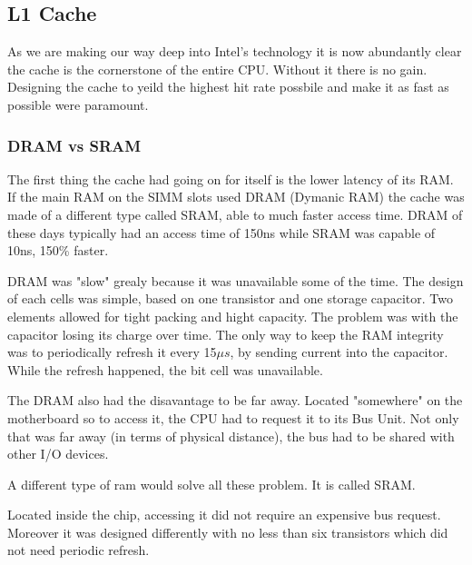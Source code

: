 \subsection{L1 Cache}
As we are making our way deep into Intel's technology it is now abundantly clear the cache is the cornerstone of the entire CPU. Without it there is no gain. Designing the cache to yeild the highest hit rate possbile and make it as fast as possible were paramount. 

\subsubsection{DRAM vs SRAM}
The first thing the cache had going on for itself is the lower latency of its RAM. If the main RAM on the SIMM slots used DRAM (Dymanic RAM) the cache was made of a different type called SRAM, able to  much faster access time. DRAM of these days typically had an access time of 150ns while SRAM was capable of 10ns, 150\% faster.\\
\par
DRAM was "slow" grealy because it was unavailable some of the time. The design of each cells was simple, based on one transistor and one storage capacitor. Two elements allowed for tight packing and hight capacity. The problem was with the capacitor losing its charge over time. The only way to keep the RAM integrity was to periodically refresh it every 15$\mu s$, by sending current into the capacitor. While the refresh happened, the bit cell was unavailable.\\
\par
{}
The DRAM also had the disavantage to be far away. Located "somewhere" on the motherboard so to access it, the CPU had to request it to its Bus Unit. Not only that was far away (in terms of physical distance), the bus had to be shared with other I/O devices.\\
\par
A different type of ram would solve all these problem. It is called SRAM.\\
\par
{}
\par
Located inside the chip, accessing it did not require an expensive bus request. Moreover it was designed differently with no less than six transistors which did not need periodic refresh.
\par










